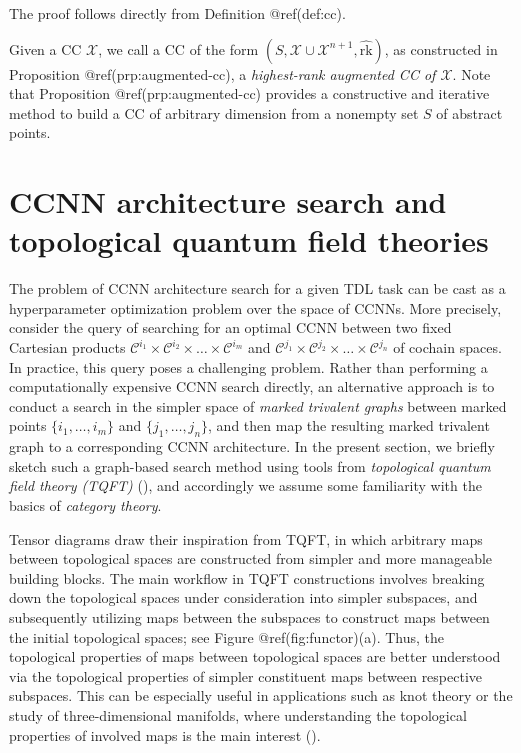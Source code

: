 \documentclass[
  12pt,
]{krantz}
\begin{document}
The proof follows directly from Definition @ref(def:cc).

Given a CC \(\mathcal{X}\), we call a CC of the form
\((S,\mathcal{X}\cup \mathcal{X}^{n+1},\hat{\mbox{rk}} )\), as
constructed in Proposition @ref(prp:augmented-cc), a \emph{highest-rank
augmented CC of \(\mathcal{X}\)}. Note that Proposition
@ref(prp:augmented-cc) provides a constructive and iterative method to
build a CC of arbitrary dimension from a nonempty set \(S\) of abstract
points.

\section{CCNN architecture search and topological quantum field
theories}\label{ccnn-architecture-search-and-topological-quantum-field-theories}

The problem of CCNN architecture search for a given TDL task can be cast
as a hyperparameter optimization problem over the space of CCNNs. More
precisely, consider the query of searching for an optimal CCNN between
two fixed Cartesian products
\(\mathcal{C}^{i_1}\times\mathcal{C}^{i_2}\times \ldots \times  \mathcal{C}^{i_m}\)
and
\(\mathcal{C}^{j_1}\times\mathcal{C}^{j_2}\times \ldots \times \mathcal{C}^{j_n}\)
of cochain spaces. In practice, this query poses a challenging problem.
Rather than performing a computationally expensive CCNN search directly,
an alternative approach is to conduct a search in the simpler space of
\emph{marked trivalent graphs} between marked points
\(\{i_1,\ldots,i_m\}\) and \(\{j_1,\ldots,j_n\}\), and then map the
resulting marked trivalent graph to a corresponding CCNN architecture.
In the present section, we briefly sketch such a graph-based search
method using tools from \emph{topological quantum field theory (TQFT)}
(), and accordingly we
assume some familiarity with the basics of \emph{category theory}.

Tensor diagrams draw their inspiration from TQFT, in which arbitrary
maps between topological spaces are constructed from simpler and more
manageable building blocks. The main workflow in TQFT constructions
involves breaking down the topological spaces under consideration into
simpler subspaces, and subsequently utilizing maps between the subspaces
to construct maps between the initial topological spaces; see Figure
@ref(fig:functor)(a). Thus, the topological properties of maps between
topological spaces are better understood via the topological properties
of simpler constituent maps between respective subspaces. This can be
especially useful in applications such as knot theory or the study of
three-dimensional manifolds, where understanding the topological
properties of involved maps is the main interest
().
\end{document}

